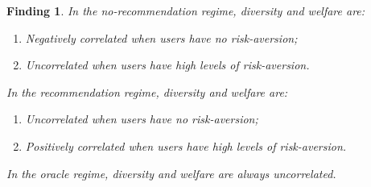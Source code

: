 \documentclass[manuscript, nonacm]{acmart}
\newtheorem{finding}{Finding}
\begin{document}
\begin{finding}\label{finding_diversity_welfare_corr}
In the no-recommendation regime, diversity and welfare are:
\begin{enumerate}
\item Negatively correlated when users have no risk-aversion;
\item Uncorrelated when users have high levels of risk-aversion.
\end{enumerate}
In the recommendation regime, diversity and welfare are:
\begin{enumerate}
\item Uncorrelated when users have no risk-aversion;
\item Positively correlated when users have high levels of risk-aversion.
\end{enumerate}
In the oracle regime, diversity and welfare are always uncorrelated.
\end{finding}
\end{document}
